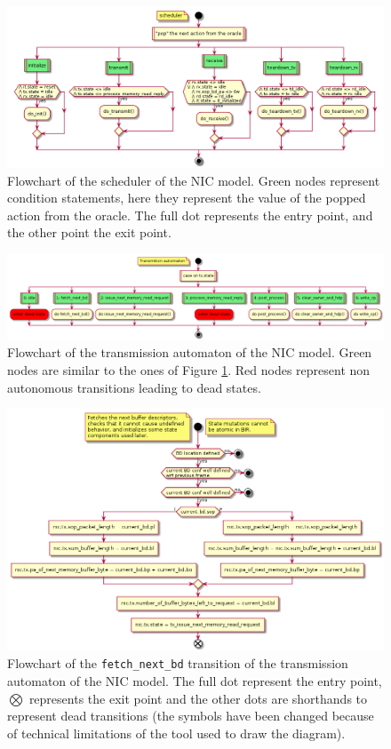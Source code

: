 \documentclass[10pt,a4paper]{article}
\begin{document}
\begin{figure}[htbp]
	\includegraphics[width=\columnwidth]{figures/flowchart-scheduler.png}
	\centering
	\caption{Flowchart of the scheduler of the NIC model. Green nodes represent condition statements, here they represent the value of the popped action from the oracle. The full dot represents the entry point, and the other point the exit point.}
	\label{flowchart-scheduler}
\end{figure}

\begin{figure}[htbp]
	\includegraphics[width=\columnwidth]{figures/flowchart-tx.png}
	\centering
	\caption{Flowchart of the transmission automaton of the NIC model. Green nodes are similar to the ones of Figure \ref{flowchart-scheduler}. Red nodes represent non autonomous transitions leading to dead states.}
	\label{flowchart-tx}
\end{figure}

\begin{figure}[htbp]
	\includegraphics[width=\columnwidth]{figures/flowchart-tx_fetch_next_bd.png}
	\centering
	\caption{Flowchart of the \texttt{fetch\_next\_bd} transition of the transmission automaton of the NIC model. The full dot represent the entry point, $\bigotimes$ represents the exit point and the other dots are shorthands to represent dead transitions (the symbols have been changed because of technical limitations of the tool used to draw the diagram).}
	\label{flowchart-tx_fetch_next_bd}
\end{figure}
\end{document}

